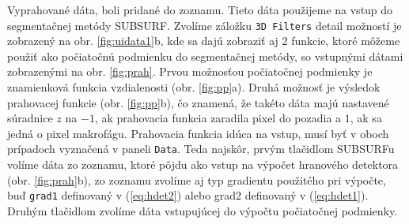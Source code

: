 \documentclass[a4paper,11pt,oneside]{article}%
\begin{document}
Vyprahované dáta, boli pridané do zoznamu. Tieto dáta použijeme na vstup do segmentačnej metódy SUBSURF. Zvolíme záložku \texttt{3D Filters} detail možností je zobrazený na obr. \ref{fig:uidata1}b, kde sa dajú zobraziť aj 2 funkcie, ktoré môžeme použiť ako počiatočnú podmienku do segmentačnej metódy, so vstupnými dátami zobrazenými na obr. \ref{fig:prah}. Prvou možnosťou počiatočnej podmienky  je znamienková funkcia vzdialenosti (obr. \ref{fig:pp}a). Druhá možnosť je výsledok prahovacej funkcie  (obr. \ref{fig:pp}b), čo znamená, že takéto dáta majú nastavené súradnice $z$ na $-1$, ak prahovacia funkcia zaradila pixel do pozadia a $1$, ak sa jedná o pixel makrofágu. Prahovacia funkcia idúca na vstup, musí byť v oboch prípadoch vyznačená v paneli \texttt{Data}.
Teda najskôr, prvým tlačidlom SUBSURFu volíme dáta zo zoznamu, ktoré pôjdu ako vstup na výpočet hranového detektora (obr. \ref{fig:prah}b), zo zoznamu zvolíme aj typ gradientu použitého pri výpočte, buď \texttt{grad1} definovaný v (\ref{eq:hdet2}) alebo grad2  definovaný v (\ref{eq:hdet1}). Druhým tlačidlom zvolíme dáta vstupujúcej do výpočtu počiatočnej podmienky.
\end{document}
